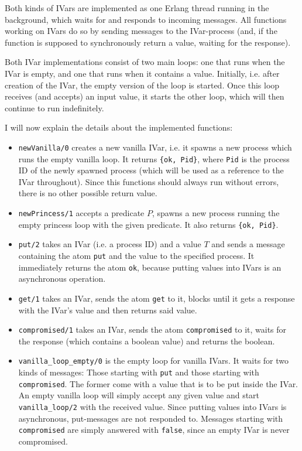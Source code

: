 \documentclass[a4paper]{article}
\begin{document}
Both kinds of IVars are implemented as one Erlang thread running in the background, which waits for and responds to incoming messages. All functions working on IVars do so by sending messages to the IVar-process (and, if the function is supposed to synchronously return a value, waiting for the response). 

Both IVar implementations consist of two main loops: one that runs when the IVar is empty, and one that runs when it contains a value. Initially, i.e. after creation of the IVar, the empty version of the loop is started. Once this loop receives (and accepts) an input value, it starts the other loop, which will then continue to run indefinitely.

I will now explain the details about the implemented functions:

\begin{itemize}
  \item \texttt{newVanilla/0} creates a new vanilla IVar, i.e. it spawns a new process which runs the empty vanilla loop. It returns \texttt{\{ok, Pid\}}, where \texttt{Pid} is the process ID of the newly spawned process (which will be used as a reference to the IVar throughout). Since this functions should always run without errors, there is no other possible return value.
  \item \texttt{newPrincess/1} accepts a predicate $P$, spawns a new process running the empty princess loop with the given predicate. It also returns \texttt{\{ok, Pid\}}.
  \item \texttt{put/2} takes an IVar (i.e. a process ID) and a value $T$ and sends a message containing the atom \texttt{put} and the value to the specified process. It immediately returns the atom \texttt{ok}, because putting values into IVars is an asynchronous operation.
  \item \texttt{get/1} takes an IVar, sends the atom \texttt{get} to it, blocks until it gets a response with the IVar's value and then returns said value.
  \item \texttt{compromised/1} takes an IVar, sends the atom \texttt{compromised} to it, waits for the response (which contains a boolean value) and returns the boolean.  
  \item \texttt{vanilla\_loop\_empty/0} is the empty loop for vanilla IVars. It waits for two kinds of messages: Those starting with \texttt{put} and those starting with \texttt{compromised}. The former come with a value that is to be put inside the IVar. An empty vanilla loop will simply accept any given value and start \texttt{vanilla\_loop/2} with the received value. Since putting values into IVars is asynchronous, put-messages are not responded to. Messages starting with \texttt{compromised} are simply answered with \texttt{false}, since an empty IVar is never compromised.
  

\end{itemize}
\end{document}
